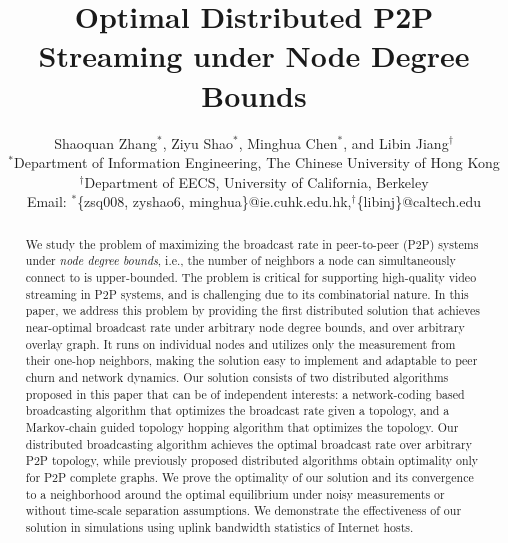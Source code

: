 \documentclass[10pt,conference]{IEEEtran}
\title{
Optimal Distributed P2P Streaming under Node Degree Bounds
}
\author{{\large Shaoquan Zhang$^{\ast}$, Ziyu Shao$^{\ast}$, Minghua Chen$^{\ast}$, and Libin Jiang$^{\dagger}$}
\\
$^{\ast}$Department of Information Engineering, The Chinese University of
Hong Kong
\\
$^{\dagger}$Department of EECS, University of California, Berkeley
\\
Email: $^{\ast}$\{zsq008, zyshao6, minghua\}@ie.cuhk.edu.hk,$^{\dagger}$\{libinj\}@caltech.edu }
\begin{document}
\maketitle

\begin{abstract}
We study the problem of maximizing the broadcast rate in peer-to-peer
(P2P) systems under \emph{node degree bounds}, i.e., the number of
neighbors a node can simultaneously connect to is upper-bounded. The
problem is critical for supporting high-quality video streaming in
P2P systems, and is challenging due to its combinatorial nature. In
this paper, we address this problem by providing the first distributed
solution that achieves near-optimal broadcast rate under arbitrary
node degree bounds, and over arbitrary overlay graph. It runs on individual
nodes and utilizes only the measurement from their one-hop neighbors,
making the solution easy to implement and adaptable to peer churn
and network dynamics. Our solution consists of two distributed algorithms
proposed in this paper that can be of independent interests: a network-coding
based broadcasting algorithm that optimizes the broadcast rate given
a topology, and a Markov-chain guided topology hopping algorithm that optimizes
the topology. Our distributed broadcasting algorithm achieves the
optimal broadcast rate over arbitrary P2P topology, while previously
proposed distributed algorithms obtain optimality only for P2P complete
graphs. We prove the optimality of our solution and its convergence
to a neighborhood around the optimal equilibrium under noisy measurements
or without time-scale separation assumptions. We demonstrate the effectiveness
of our solution in simulations using uplink bandwidth statistics of
Internet hosts.
\end{abstract}
\end{document}
